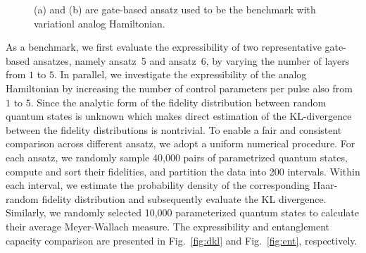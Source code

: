 \documentclass[twocolumn,
pra,aps,superscriptaddress,showpacs,amsmath,amssymb]{revtex4-2}
\begin{document}
\begin{figure}[H]
    \centering
    \hfill
{}

\caption{\small{(a) and (b) are gate-based ansatz used to be the benchmark with variationl analog Hamiltonian.}}
\label{fig:common}
    \end{figure}

As a benchmark, we first evaluate the expressibility of two representative gate-based ansatzes, namely ansatz~5 and ansatz~6, by varying the number of layers from $1$ to $5$. In parallel, we investigate the expressibility of the analog Hamiltonian by increasing the number of control parameters per pulse also from $1$ to $5$. 
Since the analytic form of the fidelity distribution between random quantum states is unknown which makes direct estimation of the KL-divergence between the fidelity distributions is nontrivial. To enable a fair and consistent comparison across different ansatz, we adopt a uniform numerical procedure. For each ansatz, we randomly sample 40,000 pairs of parametrized quantum states, compute and sort their fidelities, and partition the data into 200 intervals. Within each interval, we estimate the probability density of the corresponding Haar-random fidelity distribution and subsequently evaluate the KL divergence. Similarly, we randomly selected 10,000 parameterized quantum states to calculate their average Meyer-Wallach measure. The expressibility and entanglement capacity comparison are presented in Fig.~\ref{fig:dkl} and Fig.~\ref{fig:ent}, respectively.
\end{document}
